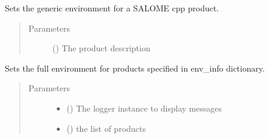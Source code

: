 \documentclass[a4paper,10pt,english]{sphinxmanual}
\begin{document}
\begin{fulllineitems}

\begin{fulllineitems}
\label{\detokenize{commands/apidoc/src:src.environment.SalomeEnviron.set_cpp_env}}
Sets the generic environment for a SALOME cpp product.
\begin{quote}\begin{description}
\item[{Parameters}] \leavevmode
{} () \textendash{} The product description

\end{description}\end{quote}

\end{fulllineitems}


\begin{fulllineitems}
\label{\detokenize{commands/apidoc/src:src.environment.SalomeEnviron.set_full_environ}}
Sets the full environment for products 
specified in env\_info dictionary.
\begin{quote}\begin{description}
\item[{Parameters}] \leavevmode\begin{itemize}
\item {} 
 () \textendash{} The logger instance to display messages

\item {} 
 () \textendash{} the list of products

\end{itemize}

\end{description}\end{quote}

\end{fulllineitems}



\end{fulllineitems}
\end{document}
